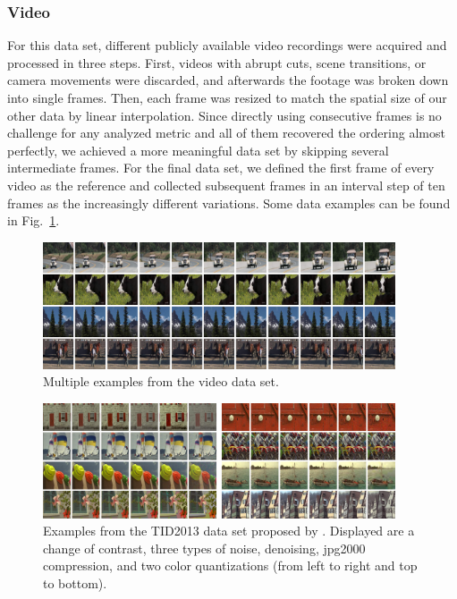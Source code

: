 \subsubsection*{Video}
For this data set, different publicly available video recordings were acquired and processed in three steps. 
First, videos with abrupt cuts, scene transitions, or camera movements were discarded, and afterwards the footage was broken down into single frames. Then, each frame was resized to match the spatial size of our other data by linear interpolation. Since directly using consecutive frames is no challenge for any analyzed metric and all of them recovered the ordering almost perfectly, we achieved a more meaningful data set by skipping several intermediate frames. For the final data set, we defined the first frame of every video as the reference and collected subsequent frames in an interval step of ten frames as the increasingly different variations. Some data examples can be found in Fig.~\ref{fig: video example}.

\begin{figure}[ht]
    \centering
    \includegraphics[width=0.93\textwidth]{ImagesDatasets/VideoDefault_small}
    \caption{Multiple examples from the video data set.}
    \label{fig: video example}
\end{figure}

\begin{figure}[ht]
    \centering
    \includegraphics[width=0.93\textwidth]{ImagesDatasets/TID2013Default_small}
    \caption{Examples from the TID2013 data set proposed by \citeauthor{ponomarenko2015}. Displayed are a change of contrast, three types of noise, denoising, jpg2000 compression, and two color quantizations (from left to right and top to bottom).}
    \label{fig: TID example}
\end{figure}


